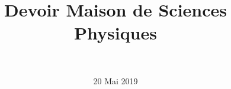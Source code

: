 \documentclass[a4paper,11pt]{exam}
\author{\ }
\date{20 Mai 2019}
\title{Devoir Maison de Sciences Physiques}
\begin{document}
%	

	\maketitle
%	
	
	



%
%
%

%






%







\newpage






\newpage 


%

%




 
%
\ \label{LastPage}
\end{document}

